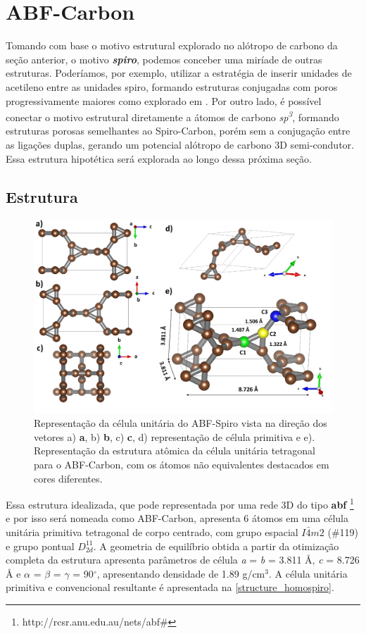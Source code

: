 \section{ABF-Carbon}
		
		Tomando com base o motivo estrutural explorado no alótropo de carbono da seção anterior, o motivo \textbf{\textit{spiro}}, podemos conceber uma miríade de outras estruturas. Poderíamos, por exemplo, utilizar a estratégia de inserir unidades de acetileno entre as unidades spiro, formando estruturas conjugadas com poros progressivamente maiores como explorado em \cite{costa2018n}. Por outro lado, é possível conectar o motivo estrutural diretamente a átomos de carbono \textit{sp\textsuperscript{3}}, formando estruturas porosas semelhantes ao Spiro-Carbon, porém sem a conjugação entre as ligações duplas, gerando um potencial alótropo de carbono 3D semi-condutor. Essa estrutura hipotética será explorada ao longo dessa próxima seção.
	
	\subsection{Estrutura}
	
				
		\begin{figure}[ht!]
			\centering
			\includegraphics[width=.9\linewidth]{capitulos/fig/results2/structure}
			\caption{Representação da célula unitária do ABF-Spiro vista na direção dos vetores a) \textbf{a}, b) \textbf{b}, c) \textbf{c}, d) representação de célula primitiva e e). Representação da estrutura atômica da célula unitária tetragonal para o ABF-Carbon, com os átomos não equivalentes destacados em cores diferentes.}
			\label{structure_homospiro}
		\end{figure}	
	
		Essa estrutura idealizada, que pode representada por uma rede 3D do tipo \textbf{abf} \footnote{http://rcsr.anu.edu.au/nets/abf\#} e por isso será nomeada como ABF-Carbon, apresenta 6 átomos em uma célula unitária primitiva tetragonal de corpo centrado, com grupo espacial $I\bar{4}m2$ (\#119) e grupo pontual $D_{2d}^{11}$. A geometria de equilíbrio obtida a partir da otimização completa da estrutura apresenta parâmetros de célula \textit{a} = \textit{b} = 3.811 Å, \textit{c} = 8.726 Å e $\alpha$ = $\beta$ = $\gamma$ = 90$^\circ$, apresentando densidade de 1.89 g/cm$^3$. A célula unitária primitiva e convencional resultante é apresentada na \autoref{structure_homospiro}.

